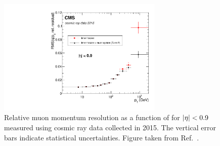 \begin{figure}
  \centering
  \includegraphics[width=0.7\textwidth]{Figures/Detector/CMS/muon_momentum_resolution.pdf}
  \caption[Muon Momentum Resolution as a Function of \pt]{Relative muon momentum resolution as a function of \pt for $\lvert \eta \rvert < 0.9$ measured using cosmic ray data collected in 2015. The vertical error bars indicate statistical uncertainties. Figure taken from Ref.~\cite{CMS:2018rym}.}\label{fig:muon_resolution}
\end{figure}